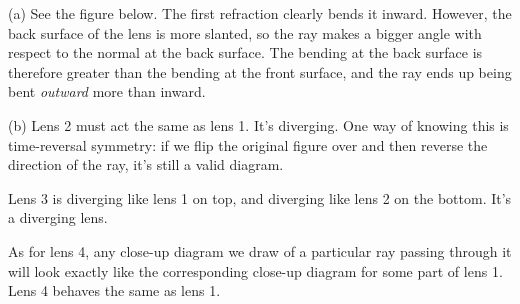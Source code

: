 (a) See the figure below. The first refraction clearly
bends it inward. However, the back surface of the lens is
more slanted, so the ray makes a bigger angle with respect
to the normal at the back surface. The bending at the back
surface is therefore greater than the bending  at the front
surface, and the ray ends up being bent \emph{outward} more than inward.


(b) Lens 2 must act the same as lens 1. It's diverging. One
way of knowing this is time-reversal symmetry: if we flip
the original figure over and then reverse the direction of
the ray, it's still a valid diagram.

Lens 3 is diverging like lens 1 on top, and diverging
like lens 2 on the bottom. It's a diverging lens.

As for lens 4, any close-up diagram we draw of a particular
ray passing through it will look exactly like the corresponding
close-up diagram for some part of lens 1. Lens 4 behaves the same as lens 1.




